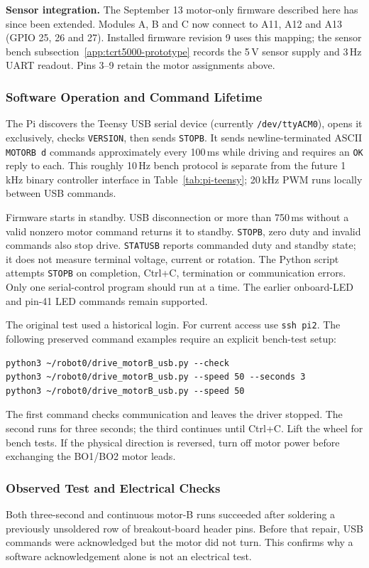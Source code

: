 \noindent\textbf{Sensor integration.} The September 13 motor-only firmware described here has since been extended. Modules A, B and C now connect to A11, A12 and A13 (GPIO 25, 26 and 27). Installed firmware revision 9 uses this mapping; the sensor bench subsection~\ref{app:tcrt5000-prototype} records the 5\,V sensor supply and 3\,Hz UART readout. Pins 3--9 retain the motor assignments above.

\subsubsection{Software Operation and Command Lifetime}
The Pi discovers the Teensy USB serial device (currently \texttt{/dev/ttyACM0}), opens it exclusively, checks \texttt{VERSION}, then sends \texttt{STOPB}. It sends newline-terminated ASCII \texttt{MOTORB d} commands approximately every 100\,ms while driving and requires an \texttt{OK} reply to each. This roughly 10\,Hz bench protocol is separate from the future 1\,kHz binary controller interface in Table~\ref{tab:pi-teensy}; 20\,kHz PWM runs locally between USB commands.

Firmware starts in standby. USB disconnection or more than 750\,ms without a valid nonzero motor command returns it to standby. \texttt{STOPB}, zero duty and invalid commands also stop drive. \texttt{STATUSB} reports commanded duty and standby state; it does not measure terminal voltage, current or rotation. The Python script attempts \texttt{STOPB} on completion, Ctrl+C, termination or communication errors. Only one serial-control program should run at a time. The earlier onboard-LED and pin-41 LED commands remain supported.

The original test used a historical login. For current access use \texttt{ssh pi2}. The following preserved command examples require an explicit bench-test setup:
\begin{verbatim}
python3 ~/robot0/drive_motorB_usb.py --check
python3 ~/robot0/drive_motorB_usb.py --speed 50 --seconds 3
python3 ~/robot0/drive_motorB_usb.py --speed 50
\end{verbatim}
The first command checks communication and leaves the driver stopped. The second runs for three seconds; the third continues until Ctrl+C. Lift the wheel for bench tests. If the physical direction is reversed, turn off motor power before exchanging the BO1/BO2 motor leads.

\subsubsection{Observed Test and Electrical Checks}
Both three-second and continuous motor-B runs succeeded after soldering a previously unsoldered row of breakout-board header pins. Before that repair, USB commands were acknowledged but the motor did not turn. This confirms why a software acknowledgement alone is not an electrical test.

